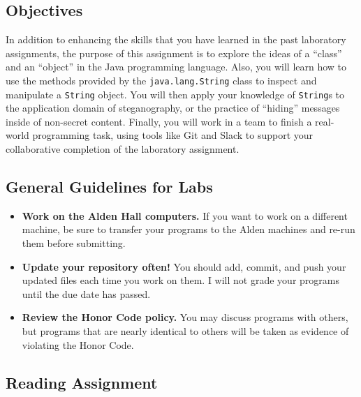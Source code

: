 



\subsection*{Objectives}
\vspace{-0.05in}

In addition to enhancing the skills that you have learned in the past laboratory assignments, the purpose of this
assignment is to explore the ideas of a ``class'' and an ``object'' in the Java programming language.  Also, you will
learn how to use the methods provided by the {\tt java.lang.String} class to inspect and manipulate a {\tt String}
object. You will then apply your knowledge of {\tt String}s to the application domain of steganography, or the practice
of ``hiding'' messages inside of non-secret content. Finally, you will work in a team to finish a real-world programming
task, using tools like Git and Slack to support your collaborative completion of the laboratory assignment.

\subsection*{General Guidelines for Labs}
\vspace{-0.05in}
\begin{itemize}
\item
{\bf Work on the Alden Hall computers.} If you want to work on a different
machine, be sure to transfer your programs to the Alden
machines and re-run them before submitting.
\item
{\bf Update your repository often!} You should add, commit,
and push your updated files each time you work on them.  I will not grade
your programs until the due date has passed.
\item
{\bf Review the Honor Code policy.} You
may discuss programs with others, but programs that are nearly identical
to others will be taken as evidence of violating the Honor Code.
\end{itemize}

\vspace{-0.1in}
\subsection*{Reading Assignment}
\vspace{-0.05in}


